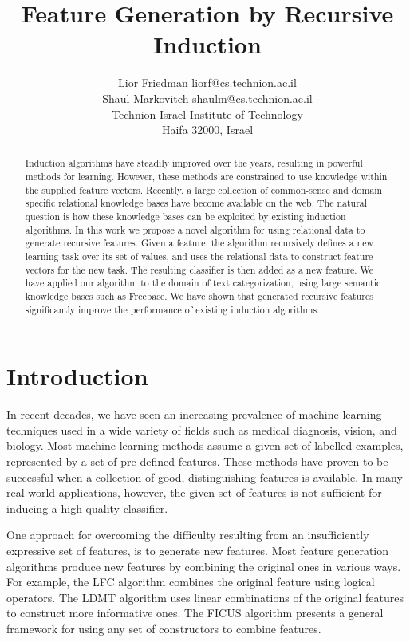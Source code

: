 \documentclass[twoside,11pt]{article}
\title{Feature Generation by Recursive Induction}
\author{\name Lior Friedman \email liorf@cs.technion.ac.il \\
	\name Shaul Markovitch \email shaulm@cs.technion.ac.il \\
	\addr Technion-Israel Institute of Technology\\
	Haifa 32000, Israel
	}
\theoremstyle{definition}
\begin{document}
\maketitle

\begin{abstract}
  Induction algorithms have steadily improved over the years, resulting in powerful methods for learning. However, these methods are constrained to use knowledge within the supplied feature vectors. Recently, a large collection of common-sense and domain specific relational knowledge bases have become available on the web. The natural question is how these knowledge bases can be exploited by existing induction algorithms.
  In this work we propose a novel algorithm for using relational data to generate recursive features. Given a feature, the algorithm recursively defines a new learning task over its set of values, and uses the relational data to construct feature vectors for the new task. The resulting classifier is then added as a new feature.
  We have applied our algorithm to the domain of text categorization, using large semantic knowledge bases such as Freebase. We have shown that generated recursive features significantly improve the performance of existing induction algorithms.
\end{abstract}

\section{Introduction}
\label{sec:Intro}
In recent decades, we have seen an increasing prevalence of machine learning techniques used in a wide variety of fields such as medical diagnosis, vision, and biology.
Most machine learning methods assume a given set of labelled examples, represented by a set of
pre-defined features. These methods have proven to be successful when a collection of good,
distinguishing features is available.
In many real-world applications, however, the given set of features is not sufficient for inducing a high quality classifier.

One approach for overcoming the difficulty resulting from an insufficiently expressive set of features, is to generate new features.  Most feature generation algorithms produce new features by combining the original ones in various ways.  For example, the LFC algorithm \cite{ragavan1993complex} combines the original feature using logical operators.  The LDMT algorithm \cite{utgo1991linear} uses linear combinations of the original features to construct more informative ones.  The FICUS algorithm \cite{markovitch2002feature} presents a general framework for using any set of constructors to combine features.
\end{document}
